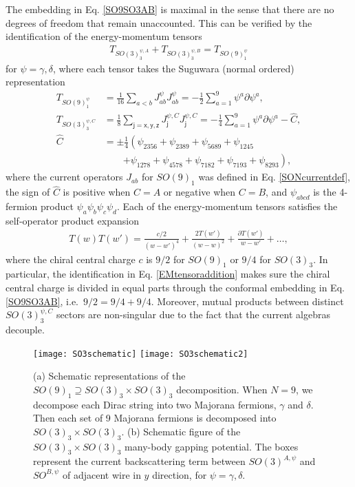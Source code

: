 The embedding in Eq. \eqref{SO9SO3AB} is maximal in the sense that there are no degrees of freedom that remain unaccounted. This can be verified by the identification of the energy-momentum tensors \begin{align}T_{SO(3)_3^{\psi,A}}+T_{SO(3)_3^{\psi,B}}=T_{SO(9)_1^\psi}\label{EMtensoraddition}\end{align} for $\psi=\gamma,\delta$, where each tensor takes the Suguwara (normal ordered) representation~\cite{bigyellowbook} \begin{align}T_{SO(9)_1^\psi}&=\frac{1}{16}\sum_{a<b}J_{ab}^\psi J_{ab}^\psi=-\frac{1}{2}\sum_{a=1}^9\psi^a\partial\psi^a,\\T_{SO(3)_3^{\psi,C}}&=\frac{1}{8}\sum_{\mathsf{j}=\mathsf{x},\mathsf{y},\mathsf{z}}J^{\psi,C}_{\mathsf{j}}J^{\psi,C}_{\mathsf{j}}=-\frac{1}{4}\sum_{a=1}^9\psi^a\partial\psi^a-\hat{C},\\\hat{C}&=\pm\frac{1}{4}\left(\psi_{2356}+\psi_{2389}+\psi_{5689}+\psi_{1245}\right.\nonumber\\&\quad\quad\left.+\psi_{1278}+\psi_{4578}+\psi_{7182}+\psi_{7193}+\psi_{8293}\right),\nonumber\end{align} where the current operators $J_{ab}$ for $SO(9)_1$ was defined in Eq. \eqref{SONcurrentdef}, the sign of $\hat{C}$ is positive when $C=A$ or negative when $C=B$, and $\psi_{abcd}$ is the 4-fermion product $\psi_a\psi_b\psi_c\psi_d$. Each of the energy-momentum tensors satisfies the self-operator product expansion \begin{align}T(w)T(w')=\frac{c/2}{(w-w')^4}+\frac{2T(w')}{(w-w)^2}+\frac{\partial T(w')}{w-w'}+\ldots,\end{align} where the chiral central charge $c$ is $9/2$ for $SO(9)_1$ or $9/4$ for $SO(3)_3$. In particular, the identification in Eq. \eqref{EMtensoraddition} makes sure the chiral central charge is divided in equal parts through the conformal embedding in Eq. \eqref{SO9SO3AB}, i.e.~$9/2=9/4+9/4$. Moreover, mutual products between distinct $SO(3)_3^{\psi,C}$ sectors are non-singular due to the fact that the current algebras decouple.

\begin{figure}[htbp]
	\centering\texttt{[image: SO3schematic]}
	\centering\texttt{[image: SO3schematic2]}
	\caption[(a) Schematic representations of the $SO(9)_1\supseteq SO(3)_3\times SO(3)_3$ decomposition. (b) Schematic figure of the $SO(3)_3\times SO(3)_3$ many-body gapping potential.]{(a) Schematic representations of the $SO(9)_1\supseteq SO(3)_3\times SO(3)_3$ decomposition. When $N=9$, we decompose each Dirac string into two Majorana fermions, $\gamma$ and $\delta$. Then each set of 9 Majorana fermions is decomposed into $SO(3)_3\times SO(3)_3$. (b) Schematic figure of the $SO(3)_3\times SO(3)_3$ many-body gapping potential. The boxes represent the current backscattering term between $SO(3)^{A,\psi}$ and $SO^{B,\psi}$ of adjacent wire in $y$ direction, for $\psi=\gamma,\delta$.}
	\label{Fig:SO3}
\end{figure}

